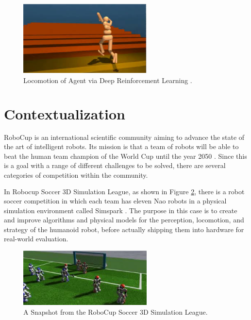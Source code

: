\begin{figure}[ht!]
\centering
\includegraphics[width=0.6\textwidth]{Cap1/Locomotion}
\caption{Locomotion of Agent via Deep Reinforcement Learning \cite{DBLP:journals/corr/HeessTSLMWTEWER17}.}
\label{locomotion}
\end{figure}


\section{Contextualization}

RoboCup is an international scientific community aiming to advance the state of the art of intelligent robots. Its mission is that a team of robots will be able to beat the human team champion of the World Cup until the year 2050 \cite{10.1007/3-540-64473-3_46}. Since this is a goal with a range of different challenges to be solved, there are several categories of competition within the community.

In Robocup Soccer 3D Simulation League, as shown in Figure \ref{soccer3d}, there is a robot soccer competition in which each team has eleven Nao robots in a physical simulation environment called Simspark \cite{simspark2005}. The purpose in this case is to create and improve algorithms and physical models for the perception, locomotion, and strategy of the humanoid robot, before actually shipping them into hardware for real-world evaluation.

\begin{figure}[ht!]
\centering
\includegraphics[width=0.6\textwidth]{Cap1/Soccer3D}
\caption{A Snapshot from the RoboCup Soccer 3D Simulation League.}
\label{soccer3d}
\end{figure}

